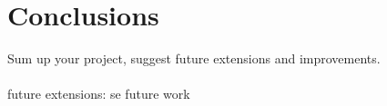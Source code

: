 \chapter{Conclusions}
Sum up your project, suggest future extensions and improvements.
\\\\
future extensions: se future work
